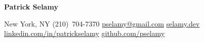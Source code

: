 {\Huge\bfseries Patrick Selamy}\par\vspace{3pt}
{\small New York, NY \textbar{} (210)~704-7370 \textbar{} \href{mailto:pselamy@gmail.com}{pselamy@gmail.com} \textbar{} \href{https://selamy.dev}{selamy.dev} \textbar{} \href{https://www.linkedin.com/in/patrickselamy}{linkedin.com/in/patrickselamy} \textbar{} \href{https://github.com/pselamy}{github.com/pselamy}}\par
